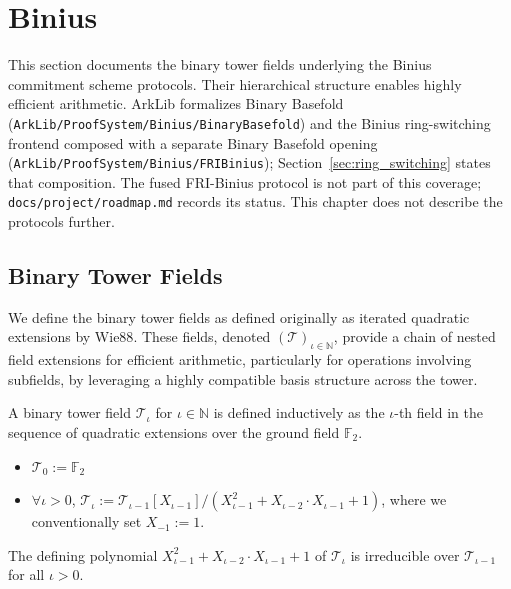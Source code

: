 \section{Binius}\label{sec:binius}

This section documents the binary tower fields underlying the Binius commitment scheme protocols. Their hierarchical structure enables highly efficient arithmetic. ArkLib formalizes Binary Basefold (\texttt{ArkLib/ProofSystem/Binius/BinaryBasefold}) and the Binius ring-switching frontend composed with a separate Binary Basefold opening (\texttt{ArkLib/ProofSystem/Binius/FRIBinius}); Section~\ref{sec:ring_switching} states that composition. The fused FRI-Binius protocol is not part of this coverage; \texttt{docs/project/roadmap.md} records its status. This chapter does not describe the protocols further.

\subsection{Binary Tower Fields}

We define the binary tower fields \cite{DP25} as defined originally as iterated quadratic extensions by Wie88\cite{Wie88}. These fields, denoted $(\mathcal{T})_{\iota \in \mathbb{N}}$, provide a chain of nested field extensions for efficient arithmetic, particularly for operations involving subfields, by leveraging a highly compatible basis structure across the tower.

\begin{definition}
    \leanok
    \label{def:binary_tower_field}
    A binary tower field $\mathcal{T}_{\iota}$ for $\iota \in \mathbb{N}$ is defined inductively as the $\iota$-th field in the sequence of quadratic extensions over the ground field $\mathbb{F}_2$.
    \begin{itemize}
        \item $\mathcal{T}_{0} := \mathbb{F}_{2}$
        \item $\forall \iota > 0$, $\mathcal{T}_{\iota} := \mathcal{T}_{\iota-1}[X_{\iota-1}] / (X_{\iota-1}^{2}+X_{\iota-2} \cdot X_{\iota-1}+1)$, where we conventionally set $X_{-1} := 1$.
    \end{itemize}
\end{definition}

\begin{theorem}
    \leanok
    \label{thm:binary_tower_field_irreducible}
    The defining polynomial $X_{\iota-1}^{2}+X_{\iota-2} \cdot X_{\iota-1}+1$ of $\mathcal{T}_{\iota}$ is irreducible over $\mathcal{T}_{\iota-1}$ for all $\iota > 0$.
\end{theorem}

